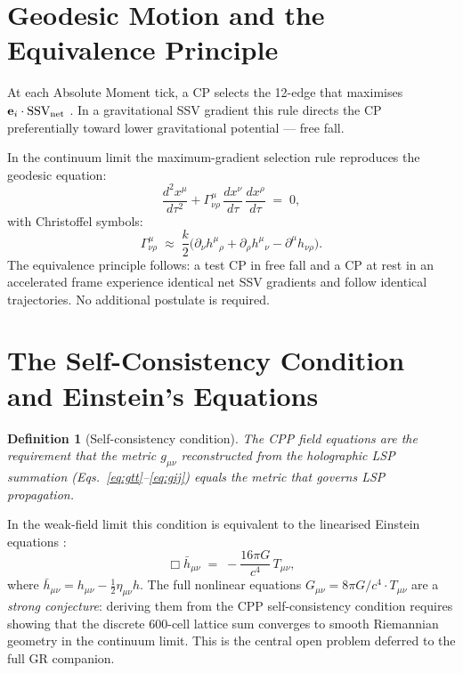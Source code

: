 \documentclass[12pt]{article}
\newtheorem{definition}[theorem]{Definition}
\newcommand{\SSV}{\text{SSV}}
\newcommand{\gmn}{g_{\mu\nu}}
\newcommand{\Gmn}{G_{\mu\nu}}
\newcommand{\Tmn}{T_{\mu\nu}}
\begin{document}
\section{Geodesic Motion and the Equivalence Principle}
\label{sec:geodesic}

At each Absolute Moment tick, a CP selects the 12-edge that maximises
$\mathbf{e}_i\cdot\mathbf{\SSV}_{\rm net}$
\citep[{\S}3, Eq.~3]{abshier2026am}.  In a gravitational SSV gradient
this rule directs the CP preferentially toward lower gravitational
potential --- free fall.

In the continuum limit the maximum-gradient selection rule reproduces
the geodesic equation:
\begin{equation}
  \frac{d^2 x^\mu}{d\tau^2}
  + \Gamma^\mu_{\nu\rho}\,\frac{dx^\nu}{d\tau}\,\frac{dx^\rho}{d\tau}
  \;=\; 0,
  \label{eq:geodesic}
\end{equation}
with Christoffel symbols:
\begin{equation}
  \Gamma^\mu_{\nu\rho} \;\approx\;
  \frac{k}{2}\bigl(\partial_\nu h^\mu{}_\rho
  + \partial_\rho h^\mu{}_\nu
  - \partial^\mu h_{\nu\rho}\bigr).
  \label{eq:Christoffel}
\end{equation}
The equivalence principle follows: a test CP in free fall and a CP at
rest in an accelerated frame experience identical net SSV gradients
\citep{abshier2026grav} and follow identical trajectories.  No
additional postulate is required.

\section{The Self-Consistency Condition and Einstein's Equations}
\label{sec:EFE}

\begin{definition}[Self-consistency condition]
The CPP field equations are the requirement that the metric $\gmn$
reconstructed from the holographic LSP summation
(Eqs.~\eqref{eq:gtt}--\eqref{eq:gij}) equals the metric that governs
LSP propagation.
\end{definition}

In the weak-field limit this condition is equivalent to the linearised
Einstein equations \citep{einstein1915}:
\begin{equation}
  \Box\bar{h}_{\mu\nu} \;=\; -\frac{16\pi G}{c^4}\,T_{\mu\nu},
  \label{eq:EFE_linear}
\end{equation}
where $\bar{h}_{\mu\nu} = h_{\mu\nu} - \frac{1}{2}\eta_{\mu\nu}h$.
The full nonlinear equations
$\Gmn = 8\pi G/c^4\cdot\Tmn$ \citep{einstein1915}
are a \emph{strong conjecture}: deriving them from the CPP
self-consistency condition requires showing that the discrete 600-cell
lattice sum converges to smooth Riemannian geometry in the continuum
limit.  This is the central open problem deferred to the full GR
companion.
\end{document}
